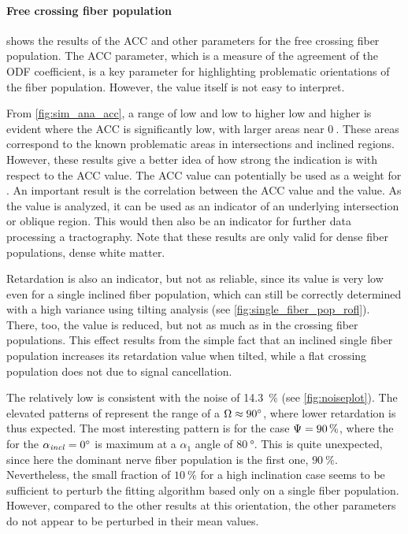 \paragraph{Free crossing fiber population}
 shows the results of the \ac{ACC} and other parameters for the free crossing fiber population.
The \ac{ACC} parameter, which is a measure of the agreement of the \ac{ODF} coefficient, is a key parameter for highlighting problematic orientations of the fiber population.
However, the value itself is not easy to interpret.
\par
%
From \ref{fig:sim_ana_acc}, a range of low \modelPsi{} and low \modelInc{} to higher low \modelPsi{} and higher \modelInc{} is evident where the \ac{ACC} is significantly low, with larger areas near $\SI{0}{}$.
These areas correspond to the known problematic areas in intersections and inclined regions.
However, these results give a better idea of how strong the indication is with respect to the \ac{ACC} value.
The \ac{ACC} value can potentially be used as a weight for .
An important result is the correlation between the \ac{ACC} value and the \trel{} value.
As the \trel{} value is analyzed, it can be used as an indicator of an underlying intersection or oblique region.
This would then also be an indicator for further data processing \eg{} a tractography.
Note that these results are only valid for dense fiber populations, \ie{} dense white matter.
\par
%
Retardation is also an indicator, but not as reliable, since its value is very low even for a single inclined fiber population, which can still be correctly determined with a high variance using tilting analysis (see \cref{fig:single_fiber_pop_rofl}).
There, too, the \trel{} value is reduced, but not as much as in the crossing fiber populations.
This effect results from the simple fact that an inclined single fiber population increases its retardation value when tilted, while a flat crossing population does not due to signal cancellation.
\par
%
The relatively low \rvalue{} is consistent with the noise of \SI{14.3}{\percent} (see \cref{fig:noiseplot}).
The elevated patterns of \rvalue{} represent the range of a $\textnormal{$\Omega$} \approx \SI{90}{\degree}$, where lower retardation is thus expected.
The most interesting pattern is for the case $\textnormal{$\Psi$} = \SI{90}{\percent}$, where the \rvalue{} for the $\textnormal{$\alpha_{\mathit{incl}}$} = \SI{0}{\degree}$ is maximum at a $\alpha_1$  angle of $\SI{80}{\degree}$.
This is quite unexpected, since here the dominant nerve fiber population is the first one, \ie{} $\SI{90}{\percent}$.
Nevertheless, the small fraction of $\SI{10}{\percent}$ for a high inclination case seems to be sufficient to perturb the fitting algorithm based only on a single fiber population.
However, compared to the other results at this orientation, the other parameters do not appear to be perturbed in their mean values.
% 
%
%
